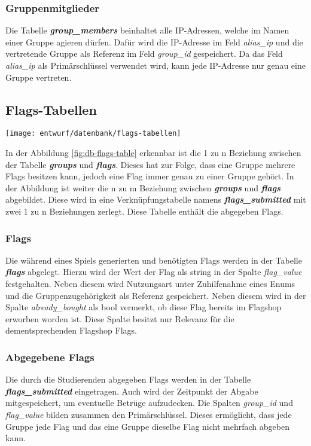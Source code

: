 \subsubsection{Gruppenmitglieder}
Die Tabelle \textbf{\textit{group\_members}} beinhaltet alle IP-Adressen, welche im Namen einer Gruppe agieren dürfen. Dafür wird die IP-Adresse im Feld \textit{alias\_ip} und die vertretende Gruppe als Referenz im Feld \textit{group\_id} gespeichert. Da das Feld \textit{alias\_ip} als Primärschlüssel verwendet wird, kann jede IP-Adresse nur genau eine Gruppe vertreten.

\subsection{Flags-Tabellen}
\begin{center}
	\texttt{[image: entwurf/datenbank/flags-tabellen]}
	\label{fig:db-flags-table}
\end{center}


In der Abbildung \ref{fig:db-flags-table} erkennbar ist die 1 zu n Beziehung zwischen der Tabelle \textbf{\textit{groups}} und \textbf{\textit{flags}}. Dieses hat zur Folge, dass eine Gruppe mehrere Flags besitzen kann, jedoch eine Flag immer genau zu einer Gruppe gehört. In der Abbildung ist weiter die n zu m Beziehung zwischen \textbf{\textit{groups}} und \textbf{\textit{flags}} abgebildet. Diese wird in eine Verknüpfungstabelle namens \textbf{\textit{flags\_submitted}} mit zwei 1 zu n Beziehungen zerlegt. Diese Tabelle enthält die abgegeben Flags.
 
\subsubsection{Flags}
Die während eines Spiels generierten und benötigten Flags werden in der Tabelle \textbf{\textit{flags}} abgelegt. Hierzu wird der Wert der Flag als string in der Spalte \textit{flag\_value} festgehalten. Neben diesem wird Nutzungsart unter Zuhilfenahme eines Enums und die Gruppenzugehörigkeit als Referenz gespeichert. Neben diesem wird in der Spalte \textit{already\_bought} als bool vermerkt, ob diese Flag bereits im Flagshop erworben worden ist. Diese Spalte besitzt nur Relevanz für die dementsprechenden Flagshop Flags.

\subsubsection{Abgegebene Flags}
Die durch die Studierenden abgegeben Flags werden in der Tabelle \textbf{\textit{flags\_submitted}} eingetragen. Auch wird der Zeitpunkt der Abgabe mitgespeichert, um eventuelle Betrüge aufzudecken. Die Spalten \textit{group\_id} und \textit{flag\_value} bilden zusammen den Primärschlüssel. Dieses ermöglicht, dass jede Gruppe jede Flag und das eine Gruppe dieselbe Flag nicht mehrfach abgeben kann.

